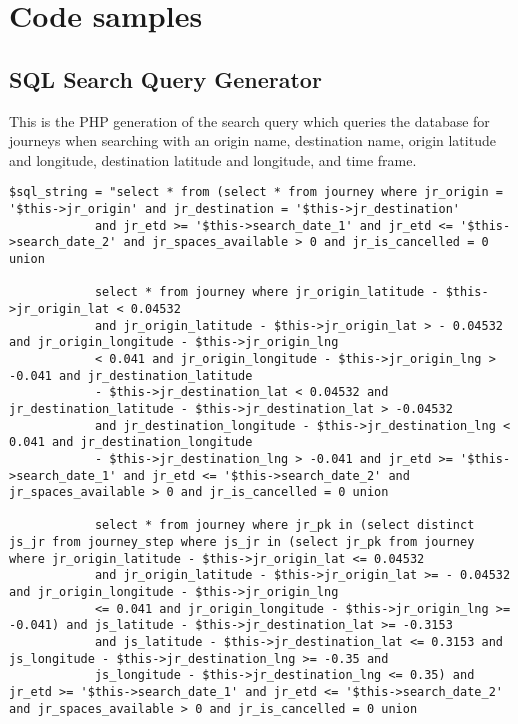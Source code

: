 \chapter{Code samples}

\section{SQL Search Query Generator}

This is the PHP generation of the search query which queries the database for journeys when searching with an origin name, destination name, origin latitude and longitude, destination latitude and longitude, and time frame.


\begin{lstlisting}
$sql_string = "select * from (select * from journey where jr_origin = '$this->jr_origin' and jr_destination = '$this->jr_destination' 
            and jr_etd >= '$this->search_date_1' and jr_etd <= '$this->search_date_2' and jr_spaces_available > 0 and jr_is_cancelled = 0 union
                
            select * from journey where jr_origin_latitude - $this->jr_origin_lat < 0.04532
            and jr_origin_latitude - $this->jr_origin_lat > - 0.04532 and jr_origin_longitude - $this->jr_origin_lng
            < 0.041 and jr_origin_longitude - $this->jr_origin_lng > -0.041 and jr_destination_latitude
            - $this->jr_destination_lat < 0.04532 and jr_destination_latitude - $this->jr_destination_lat > -0.04532
            and jr_destination_longitude - $this->jr_destination_lng < 0.041 and jr_destination_longitude
            - $this->jr_destination_lng > -0.041 and jr_etd >= '$this->search_date_1' and jr_etd <= '$this->search_date_2' and jr_spaces_available > 0 and jr_is_cancelled = 0 union
                
            select * from journey where jr_pk in (select distinct js_jr from journey_step where js_jr in (select jr_pk from journey where jr_origin_latitude - $this->jr_origin_lat <= 0.04532
            and jr_origin_latitude - $this->jr_origin_lat >= - 0.04532 and jr_origin_longitude - $this->jr_origin_lng
            <= 0.041 and jr_origin_longitude - $this->jr_origin_lng >= -0.041) and js_latitude - $this->jr_destination_lat >= -0.3153
            and js_latitude - $this->jr_destination_lat <= 0.3153 and js_longitude - $this->jr_destination_lng >= -0.35 and
            js_longitude - $this->jr_destination_lng <= 0.35) and jr_etd >= '$this->search_date_1' and jr_etd <= '$this->search_date_2' and jr_spaces_available > 0 and jr_is_cancelled = 0 union
                

\end{lstlisting}
